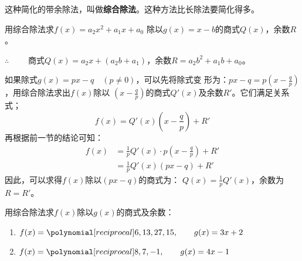 这种简化的带余除法，叫做\textbf{综合除法}。这种方法比长除法要简化得多。

\begin{example}
    用综合除法求$f(x)=a_2x^2+a_1x+a_0$ 除以$g(x)=x-b$的商式$Q(x)$，余数$R$。
\end{example}

\begin{solution}
    \begin{center}
      \end{center}
$\therefore\qquad $ 商式$Q(x)=a_2x+(a_2b+a_1)$，余数$R=a_2b^2+a_1b+a_0$。
\end{solution}

如果除式$g(x)=px-q\quad (p\ne 0)$，可以先将除式变
形为：$px-q=p\left(x-\frac{q}{p}\right)$，用综合除法求出$f(x)$除以
$\left(x-\frac{q}{p}\right)$的商式$Q'(x)$及余数$R'$。它们满足关系式；
\[f(x)=Q'(x)\left(x-\frac{q}{p}\right)+R' \]
再根据前一节的结论可知：
\[\begin{split}
f(x)&=\frac{1}{p}Q'(x)\cdot p\left(x-\frac{q}{p}\right)+R'\\
&=\frac{1}{p}Q'(x)(px-q)+R'
\end{split}\]
因此，可以求得$f(x)$除以$(px-q)$的商式为：
$Q(x)=\frac{1}{p}Q'(x)$，余数为$R=R'$。

\begin{example}
    用综合除法求$f(x)$除以$g(x)$的商式及余数：
\begin{enumerate}
    \item $f(x)=\poly{6,13,27,15},\qquad g(x)=3x+2$
    \item $f(x)=\poly{8,7,-1},\qquad g(x)=4x-1$
\end{enumerate}    
\end{example}

